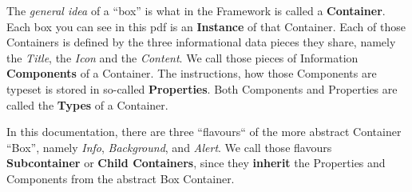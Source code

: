 The \textit{general idea} of a “box” is what in the {\CoCoTeX}
Framework is called a \textbf{Container}. Each box you can see in this
pdf is an \textbf{Instance} of that Container. Each of those
Containers is defined by the three informational data pieces they
share, namely the \textit{Title}, the \textit{Icon} and the
\textit{Content}. We call those pieces of Information
\textbf{Components} of a Container. The instructions, how those
Components are typeset is stored in so-called
\textbf{Properties}. Both Components and Properties are called the
\textbf{Types} of a Container.

In this documentation, there are three “flavours“ of the more abstract
Container “Box”, namely \textit{Info}, \textit{Background}, and
\textit{Alert}. We call those flavours \textbf{Subcontainer} or
\textbf{Child Containers}, since they \textbf{inherit} the Properties
and Components from the abstract Box Container.

